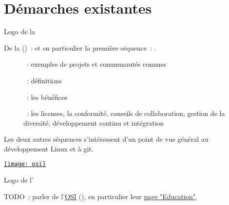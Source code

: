\chapter{Démarches existantes}

\begin{marginfigure}
    \href{https://www.linuxfoundation.org/}{}
    \caption{Logo de la }
\end{marginfigure}

De la  () :
  \href{https://www.edx.org/professional-certificate/linuxfoundationx-open-source-software-development-linux-and-git}
  {}
et en particulier la première séquence :
  \href{https://www.edx.org/course/open-source-software-development-linux-for-developers}
  {}.

\begin{description}
    \item[] : exemples de projets et communautés connues
    \item[] : définitions
    \item[] : les bénéfices
    \item[] : les licenses, la conformité, conseils de collaboration, gestion de la
        diversité, développement continu et intégration
\end{description}

Les deux autres séquences s'intéressent d'un point de vue général au développement Linux et à git.

\begin{marginfigure}
    \href{https://opensource.org/}{\texttt{[image: osi]}}
    \caption{Logo de l'}
\end{marginfigure}

TODO : parler de l'\href{https://opensource.org/}{OSI} (), en particulier leur
\href{https://opensource.org/osi-open-source-education}{page "Education"}.
